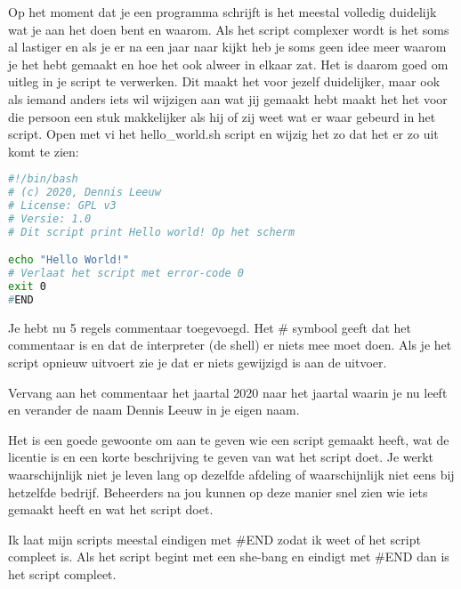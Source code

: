 Op het moment dat je een programma schrijft is het meestal volledig duidelijk wat je aan het doen bent en waarom. Als het script complexer wordt is het soms al lastiger en als je er na een jaar naar kijkt heb je soms geen idee meer waarom je het hebt gemaakt en hoe het ook alweer in elkaar zat. Het is daarom goed om uitleg in je script te verwerken. Dit maakt het voor jezelf duidelijker, maar ook als iemand anders iets wil wijzigen aan wat jij gemaakt hebt maakt het het voor die persoon een stuk makkelijker als hij of zij weet wat er waar gebeurd in het script.
Open met vi het hello\_world.sh script en wijzig het zo dat het er zo uit komt te zien:
\begin{lstlisting}[language=bash]
#!/bin/bash
# (c) 2020, Dennis Leeuw
# License: GPL v3
# Versie: 1.0
# Dit script print Hello world! Op het scherm

echo "Hello World!"
# Verlaat het script met error-code 0
exit 0
#END
\end{lstlisting}
Je hebt nu 5 regels commentaar toegevoegd. Het \# symbool geeft dat het commentaar is en dat de interpreter (de shell) er niets mee moet doen. Als je het script opnieuw uitvoert zie je dat er niets gewijzigd is aan de uitvoer.

Vervang aan het commentaar het jaartal 2020 naar het jaartal waarin je nu leeft en verander de naam Dennis Leeuw in je eigen naam.

Het is een goede gewoonte om aan te geven wie een script gemaakt heeft, wat de licentie is en een korte beschrijving te geven van wat het script doet. Je werkt waarschijnlijk niet je leven lang op dezelfde afdeling of waarschijnlijk niet eens bij hetzelfde bedrijf. Beheerders na jou kunnen op deze manier snel zien wie iets gemaakt heeft en wat het script doet.

Ik laat mijn scripts meestal eindigen met \#END zodat ik weet of het script compleet is. Als het script begint met een she-bang en eindigt met \#END dan is het script compleet.

